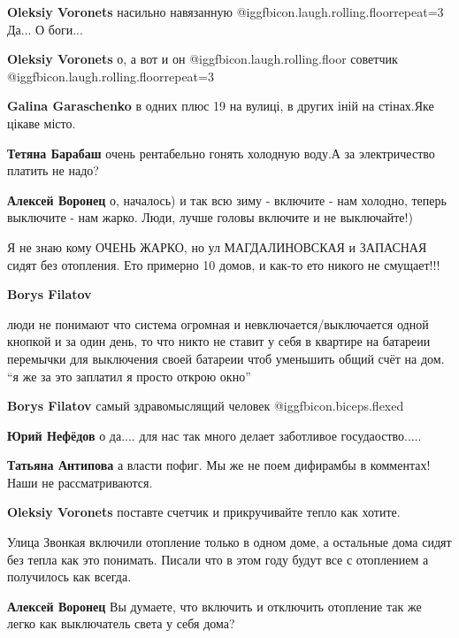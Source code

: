 \begin{itemize}
\begin{itemize}
\textbf{Oleksiy Voronets} насильно навязанную  @igg{fbicon.laugh.rolling.floor}{repeat=3} 
Да... О боги...

\textbf{Oleksiy Voronets} о, а вот и он @igg{fbicon.laugh.rolling.floor} советчик  @igg{fbicon.laugh.rolling.floor}{repeat=3} 

\textbf{Galina Garaschenko} в одних плюс 19 на вулиці, в других іній на стінах.Яке цікаве місто.

\textbf{Тетяна Барабаш} очень рентабельно гонять холодную воду.А за электричество платить не надо?

\textbf{Алексей Воронец} о, началось) и так всю зиму - включите - нам холодно, теперь выключите - нам жарко. Люди, лучше головы включите и не выключайте!)


Я не знаю кому ОЧЕНЬ ЖАРКО, но ул МАГДАЛИНОВСКАЯ и ЗАПАСНАЯ сидят без
отопления. Ето примерно 10 домов, и как-то ето никого не смущает!!!

\textbf{Borys Filatov} 

люди не понимают что система огромная и невключается/выключается одной кнопкой
и за один день, то что никто не ставит у себя в квартире на батареии перемычки
для выключения своей батареии чтоб уменьшить общий счёт на дом. \enquote{я же за это
заплатил я просто открою окно}

\textbf{Borys Filatov} самый здравомыслящий человек  @igg{fbicon.biceps.flexed} 

\textbf{Юрий Нефёдов} о да.... для нас так много делает заботливое госудаоство.....

\textbf{Татьяна Антипова} а власти пофиг. Мы же не поем дифирамбы в комментах! Наши не рассматриваются.

\textbf{Oleksiy Voronets} поставте счетчик и прикручивайте тепло как хотите.


Улица Звонкая включили отопление только в одном доме, а остальные дома сидят
без тепла как это понимать. Писали что в этом году будут все с отоплением а
получилось как всегда.

\textbf{Алексей Воронец} Вы думаете, что включить и отключить отопление так же легко как выключатель света у себя дома?


\end{itemize}
\end{itemize}
